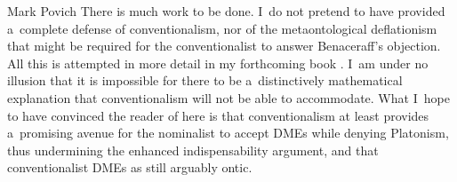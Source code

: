 \begin{artengenv}{Mark Povich}
There is much work to be done. I~do not pretend to have provided a~complete defense of conventionalism, nor of the metaontological deflationism that might be required for the conventionalist to answer Benaceraff's objection. All this is attempted in more detail in my forthcoming book
\parencite[][]{povich_rules_2024}. %
 I~am under no illusion that it is impossible for there to be a~distinctively mathematical explanation that conventionalism will not be able to accommodate. What I~hope to have convinced the reader of here is that conventionalism at least provides a~promising avenue for the nominalist to accept DMEs while denying Platonism, thus undermining the enhanced indispensability argument, and that conventionalist DMEs as still arguably ontic.
 
 
 
 
 
 
\end{artengenv}